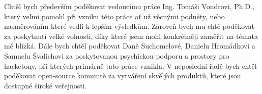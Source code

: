 \documentclass[czech,bachelor,unicode]{ctufit-thesis}
\begin{document}
 
\frontmatter\frontmatterinit %


\thispagestyle{empty}\cleardoublepage\maketitle %

\imprintpage %

\tableofcontents %
\listoffigures %
\begingroup
\let\clearpage\relax
\lstlistoflistings %
\endgroup

\begin{acknowledgmentpage}
	Chtěl bych především poděkovat vedoucímu práce Ing. Tomáši Vondrovi, Ph.D., který velmi pomohl při vzniku této práce ať už věcnými podněty, nebo nasměrováním které vedli k lepším výsledkům. Zároveň bych mu chtě poděkovat za poskytnutí velké volnosti, díky které jsem mohl konkrétněji zaměřit na témata mě blízká.
    Dále bych chtěl poděkovat Daně Suchomelové, Danielu Hromádkovi a Samuelu Švalichovi za poskytovanou psychickou podporu a prostory pro hacketony, při kterých primárně tato práce vznikla.
    V neposlední řadě bych chtěl poděkovat open-source komunitě za vytváření skvělých produktů, které jsou dostupné široké veřejnosti. 
\end{acknowledgmentpage} 
\end{document}
